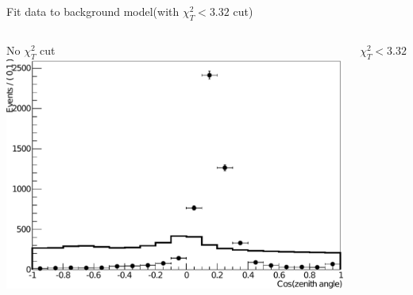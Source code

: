 \documentclass[14pt]{beamer}
\begin{document}
\begin{frame}{Fit data to background model}{(with $\chi^{2}_{T} < 3.32$ cut)}
	\begin{columns}[t]
		\centering
		\begin{block}{\centering No $\chi^{2}_{T}$ cut}
			\centering
			\includegraphics[width=\linewidth]{fit_data_to_bkg_model_noChi2TCut.pdf}
		\end{block}
		\centering
		\begin{block}{\centering $\chi^{2}_{T} < 3.32$}
\end{block}
\end{columns}
\end{frame}
\end{document}
